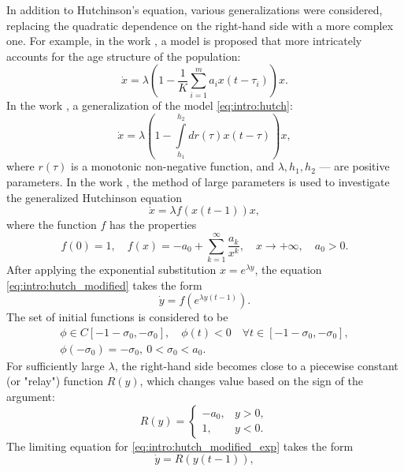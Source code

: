 In addition to Hutchinson's equation, various generalizations were considered, replacing the quadratic dependence on the right-hand side with a more complex one. For example, in the work \cite{Glyzin2007}, a model is proposed that more intricately accounts for the age structure of the population:
\begin{equation}
\label{eq:intro:glyzin2007}
	\dot{x}=\lambda \left(1 - \frac{1}{K}\sum\limits_{i = 1}^{m} a_i x(t-\tau_i)\right) x.
\end{equation}
%
In the work \cite{Kashchenko2012}, a generalization of the model \eqref{eq:intro:hutch}:
\begin{equation}
	\dot{x} = \lambda \left(1 - \int\limits_{h_1}^{h_2}dr(\tau)x(t - \tau)\right) x,
\end{equation}
where $r(\tau)$ is a monotonic non-negative function, and $\lambda, h_1, h_2$ --- are positive parameters.
In the work \cite{Kolesov2010}, the method of large parameters is used to investigate the generalized Hutchinson equation
\begin{equation}
	\label{eq:intro:hutch_modified}
	\dot{x} = \lambda f(x(t - 1)) x,
\end{equation}
where the function $f$ has the properties
\[
f(0) = 1, \quad f(x) = -a_0 + \sum\limits_{k = 1}^{\infty} \frac{a_k}{x^k}, \quad x \to +\infty, \quad a_0 > 0.
\]
After applying the exponential substitution $x = e^{\lambda y}$, the equation \eqref{eq:intro:hutch_modified} takes the form
\begin{equation}
	\label{eq:intro:hutch_modified_exp}
	\dot{y} = f(e^{\lambda y(t - 1)}).
\end{equation}
The set of initial functions is considered to be
\begin{multline}
	\label{eq:intro:hutch_init_func}
	\phi \in C[-1 - \sigma_0, -\sigma_0],\quad \phi(t) < 0 \quad \forall t \in [-1 - \sigma_0, -\sigma_0], \\ \phi(-\sigma_0) = -\sigma_0, \ 0 < \sigma_0 < a_0.
\end{multline}
For sufficiently large $\lambda$, the right-hand side becomes close to a piecewise constant (or "relay") function $R(y)$, which changes value based on the sign of the argument:
\[
R(y) = \begin{cases}
	-a_0, & y > 0,\\
	1, & y < 0.
\end{cases}
\]
The limiting equation for \eqref{eq:intro:hutch_modified_exp} takes the form
\begin{equation}
	\label{eq:hutch_relay}
	\dot{y} = R(y(t - 1)),
\end{equation}
